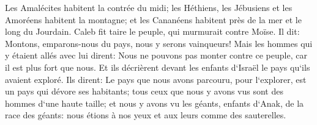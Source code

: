 \verse Les Amalécites habitent la contrée du midi; les Héthiens, les Jébusiens et les Amoréens habitent la montagne; et les Cananéens habitent près de la mer et le long du Jourdain. 
\verse Caleb fit taire le peuple, qui murmurait contre Moïse. Il dit: Montons, emparons-nous du pays, nous y serons vainqueurs! 
\verse Mais les hommes qui y étaient allés avec lui dirent: Nous ne pouvons pas monter contre ce peuple, car il est plus fort que nous. 
\verse Et ils décrièrent devant les enfants d`Israël le pays qu`ils avaient exploré. Ils dirent: Le pays que nous avons parcouru, pour l`explorer, est un pays qui dévore ses habitants; tous ceux que nous y avons vus sont des hommes d`une haute taille; 
\verse et nous y avons vu les géants, enfants d`Anak, de la race des géants: nous étions à nos yeux et aux leurs comme des sauterelles. 

\chapter{}

